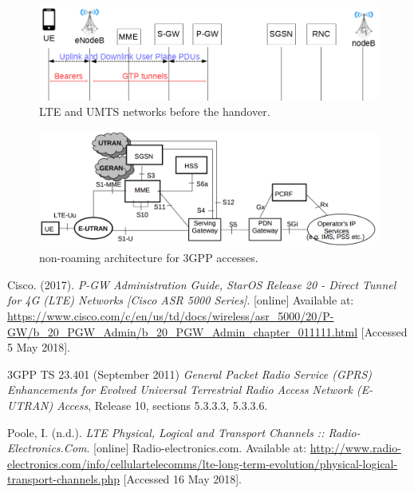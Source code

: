 \documentclass[12pt, a4paper]{article}
\begin{document}
\begin{figure}[htb]
	\centering
	\includegraphics[width=1\linewidth]{img/pre-handhover-links.png}
	\caption{LTE and UMTS networks before the handover.}
  \label{fig:pre-handover-links}
\end{figure}

\begin{figure}[htb]
	\centering
	\includegraphics[width=1\linewidth]{img/architecture-reference.png}
  \caption{non-roaming architecture for 3GPP accesses.}
	\label{fig:architecture-model}
\end{figure}







\begin{thebibliography}{99}
\footnotesize

  Cisco. (2017).
  \textit{P-GW Administration Guide, StarOS Release 20 - Direct Tunnel for 4G (LTE) Networks [Cisco ASR 5000 Series]}. [online]
  Available at: \url{https://www.cisco.com/c/en/us/td/docs/wireless/asr_5000/20/P-GW/b_20_PGW_Admin/b_20_PGW_Admin_chapter_011111.html}
  [Accessed 5 May 2018].

  3GPP TS 23.401 (September 2011)
  \textit{General Packet Radio Service (GPRS) Enhancements for Evolved Universal
  Terrestrial Radio Access Network (E-UTRAN) Access},
  Release 10,
  sections 5.3.3.3, 5.3.3.6.

  Poole, I. (n.d.).
  \textit{LTE Physical, Logical and Transport Channels :: Radio-Electronics.Com}. [online]
  Radio-electronics.com.
  Available at: \url{http://www.radio-electronics.com/info/cellulartelecomms/lte-long-term-evolution/physical-logical-transport-channels.php}
  [Accessed 16 May 2018].


\end{thebibliography}
\end{document}
